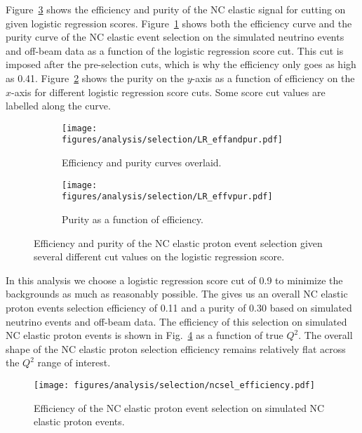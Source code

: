     Figure~\ref{fig:lreffpur} shows the efficiency and purity of the NC elastic
    signal for cutting on given logistic regression scores.
    Figure~\ref{fig:lreffnpur} shows both the efficiency curve and the purity
    curve of the NC elastic event selection on the simulated neutrino events
    and off-beam data as a function of the logistic regression score cut. This
    cut is imposed after the pre-selection cuts, which is why the efficiency
    only goes as high as 0.41. Figure~\ref{fig:lreffvpur} shows the purity on
    the $y$-axis as a function of efficiency on the $x$-axis for different
    logistic regression score cuts. Some score cut values are labelled along
    the curve.
    \begin{figure}[h]
      \centering
      \begin{subfigure}[t]{2.8in}
        \texttt{[image: figures/analysis/selection/LR\_effandpur.pdf]}\hspace{2pc}%
        \caption{Efficiency and purity curves overlaid.}
        \label{fig:lreffnpur}
      \end{subfigure}
      \hspace{2pt}
      \begin{subfigure}[t]{2.8in}
        \texttt{[image: figures/analysis/selection/LR\_effvpur.pdf]}\hspace{2pc}%
        \caption{Purity as a function of efficiency.}
        \label{fig:lreffvpur}
      \end{subfigure}
      \caption{Efficiency and purity of the NC elastic proton event selection
      given several different cut values on the logistic regression score.
      \label{fig:lreffpur}}
    \end{figure}
   
    In this analysis we choose a logistic regression score cut of 0.9 to
    minimize the backgrounds as much as reasonably possible. The gives us an
    overall NC elastic proton events selection efficiency of 0.11 and a purity
    of 0.30 based on simulated neutrino events and off-beam data. The
    efficiency of this selection on simulated NC elastic proton events is shown
    in Fig.~\ref{fig:nceeff} as a function of true $Q^2$. The overall shape of
    the NC elastic proton selection efficiency remains relatively flat across
    the $Q^2$ range of interest.
    \begin{figure}[ht]
      \centering
      \texttt{[image: figures/analysis/selection/ncsel\_efficiency.pdf]}
      \caption{Efficiency of the NC elastic proton event selection on simulated
      NC elastic proton events.}
      \label{fig:nceeff}
    \end{figure}

